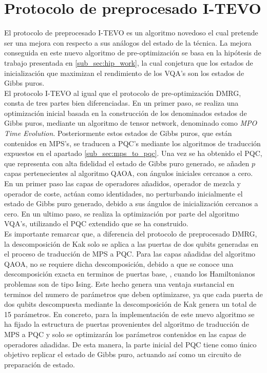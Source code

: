 \newpage

\section{Protocolo de preprocesado I-TEVO}

El protocolo de preprocesado I-TEVO es un algoritmo novedoso el cual pretende ser una mejora con respecto a sus análogos del estado de la técnica. La mejora conseguida en este nuevo algoritmo de pre-optimización se basa en la hipótesis de trabajo presentada en \ref{sub_sec:hip_work}, la cual conjetura que los estados de inicialización que maximizan el rendimiento de los VQA's son los estados de Gibbs puros. \\

El protocolo I-TEVO al igual que el protocolo de pre-optimización DMRG, consta de tres partes bien diferenciadas. En un primer paso, se realiza una optimización inicial basada en la construcción de los denominados estados de Gibbs puros, mediante un algoritmo de tensor network, denominado como \textit{MPO Time Evolution}. Posteriormente estos estados de Gibbs puros, que están contenidos en MPS's, se traducen a PQC's mediante los algoritmos de traducción expuestos en el apartado \ref{sub_sec:mps_to_pqc}. Una vez se ha obtenido el PQC, que representa con alta fidelidad el estado de Gibbs puro generado, se añaden $p$ capas pertenecientes al algoritmo QAOA, con ángulos iniciales cercanos a cero. En un primer paso las capas de operadores añadidos, operador de mezcla y operador de coste, actúan como identidades, no perturbando inicialmente el estado de Gibbs puro generado, debido a sus ángulos de inicialización cercanos a cero. En un ultimo paso, se realiza la optimización por parte del algoritmo VQA's, utilizando el PQC extendido que se ha construido. \\

Es importante remarcar que, a diferencia del protocolo de preprocesado DMRG, la descomposición de Kak solo se aplica a las puertas de dos qubits generadas en el proceso de traducción de MPS a PQC. Para las capas añadidas del algoritmo QAOA, no se requiere dicha descomposición, debido a que se conoce una descomposición exacta en terminos de puertas base, \citep{jack}, cuando los Hamiltonianos problemas son de tipo Ising. Este hecho genera una ventaja sustancial en terminos del numero de parámetros que deben optimizarse, ya que cada puerta de dos qubits descompuesta mediante la descomposición de Kak genera un total de 15 parámetros. En concreto, para la implementación de este nuevo algoritmo se ha fijado la estructura de puertas provenientes del algoritmo de traducción de MPS a PQC y solo se optimizarán los parámetros contenidos en las capas de operadores añadidas. De esta manera, la parte inicial del PQC tiene como único objetivo replicar el estado de Gibbs puro, actuando así como un circuito de preparación de estado. 

